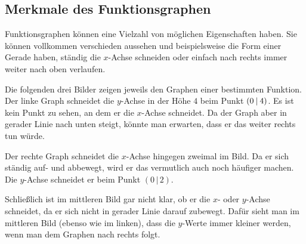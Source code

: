 \documentclass[../../main.tex]{subfiles}
\begin{document}
\subsection{Merkmale des Funktionsgraphen}

Funktionsgraphen können eine Vielzahl von möglichen Eigenschaften haben. Sie können vollkommen verschieden aussehen und beispielsweise die Form einer Gerade haben, ständig die $x$-Achse schneiden oder einfach nach rechts immer weiter nach oben verlaufen.

\begin{example}{}
    Die folgenden drei Bilder zeigen jeweils den Graphen einer bestimmten Funktion. Der linke Graph schneidet die $y$-Achse in der Höhe $4$ beim Punkt $\left(0 \:\middle|\: 4\right)$. Es ist kein Punkt zu sehen, an dem er die $x$-Achse schneidet. Da der Graph aber in gerader Linie nach unten steigt, könnte man erwarten, dass er das weiter rechts tun würde.
    \begin{multicols}{3}
        \centering
        
        
    \end{multicols}
    Der rechte Graph schneidet die $x$-Achse hingegen zweimal im Bild. Da er sich ständig auf- und abbewegt, wird er das vermutlich auch noch häufiger machen. Die $y$-Achse schneidet er beim Punkt $(0\,|\,2)$.
    
    Schließlich ist im mittleren Bild gar nicht klar, ob er die $x$- oder $y$-Achse schneidet, da er sich nicht in gerader Linie darauf zubewegt. Dafür sieht man im mittleren Bild (ebenso wie im linken), dass die $y$-Werte immer kleiner werden, wenn man dem Graphen nach rechts folgt.
\end{example}
\end{document}
